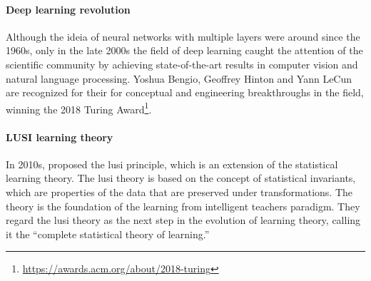 \paragraph{Deep learning revolution}

Although the ideia of neural networks with multiple layers were around since the 1960s,
only in the late 2000s the field of deep learning caught the attention of the scientific
community by achieving state-of-the-art results in computer vision and natural language
processing.  Yoshua Bengio, Geoffrey
Hinton and Yann LeCun are recognized for their for conceptual and engineering
breakthroughs in the field, winning the 2018 Turing Award\footnote{\url{https://awards.acm.org/about/2018-turing}}.

%

%

\paragraph{LUSI learning theory}

In 2010s, \citeauthor{Vapnik2015} proposed the \gls{lusi}
principle, which is an extension of the statistical learning theory.  The \gls{lusi}
theory is based on the concept of statistical invariants, which are properties of
the data that are preserved under transformations.  The theory is the foundation of the
learning from intelligent teachers paradigm.  They regard the \gls{lusi} theory as the
next step in the evolution of learning theory, calling it the ``complete statistical
theory of learning.''

